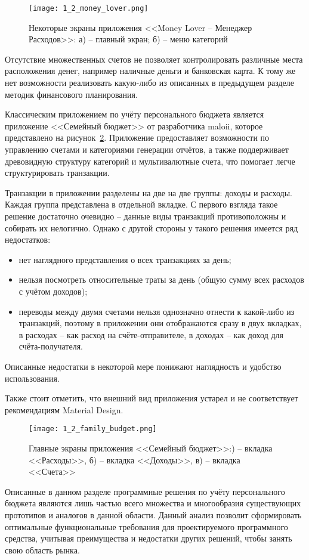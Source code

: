 \begin{figure}[h]
    \centering
    \texttt{[image: 1\_2\_money\_lover.png]}
    \caption{Некоторые экраны приложения <<Money Lover -- Менеджер Расходов>>: а) -- главный экран; б) -- меню категорий}
    \label{fig:analysis:analogues:money_lover}
\end{figure}

Отсутствие множественных счетов не позволяет контролировать различные места расположения денег, например наличные деньги и банковская карта.
К тому же нет возможности реализовать какую-либо из описанных в предыдущем разделе методик финансового планирования.

Классическим приложением по учёту персонального бюджета является приложение <<Семейный бюджет>> от разработчика maloii, которое представлено на рисунок~\ref{fig:analysis:analogues:family_budget}.
Приложение предоставляет возможности по управлению счетами и категориями генерации отчётов, а также поддерживает древовидную структуру категорий и мультивалютные счета, что помогает легче структурировать транзакции.

Транзакции в приложении разделены на две на две группы: доходы и расходы.
Каждая группа представлена в отдельной вкладке.
С первого взгляда такое решение достаточно очевидно -- данные виды транзакций противоположны и собирать их нелогично.
Однако с другой стороны у такого решения имеется ряд недостатков:
\begin{itemize}
    \item нет наглядного представления о всех транзакциях за день;
    \item нельзя посмотреть относительные траты за день (общую сумму всех расходов с учётом доходов);
    \item переводы между двумя счетами нельзя однозначно отнести к какой-либо из транзакций, поэтому в приложении они отображаются сразу в двух вкладках, в расходах -- как расход на счёте-отправителе, в доходах -- как доход для счёта-получателя.
\end{itemize}

Описанные недостатки в некоторой мере понижают наглядность и удобство использования.

Также стоит отметить, что внешний вид приложения устарел и не соответствует рекомендациям Material Design.

\begin{figure}[h]
    \centering
    \texttt{[image: 1\_2\_family\_budget.png]}
    \caption{Главные экраны приложения <<Семейный бюджет>>:) -- вкладка <<Расходы>>, б) -- вкладка <<Доходы>>, в) -- вкладка <<Счета>>}
    \label{fig:analysis:analogues:family_budget}
\end{figure}


Описанные в данном разделе программные решения по учёту персонального бюджета являются лишь частью всего множества и многообразия существующих прототипов и аналогов в данной области.
Данный анализ позволит сформировать оптимальные функциональные требования для проектируемого программного средства, учитывая преимущества и недостатки других решений, чтобы занять свою область рынка.